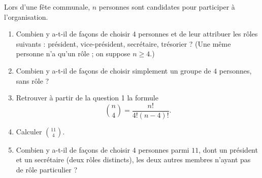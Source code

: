 Lors d'une fête communale, $n$ personnes sont candidates pour participer à
l'organisation.
\begin{enumerate}
  \item Combien y a-t-il de façons de choisir $4$ personnes et de leur
  attribuer les rôles suivants : président, vice-président, secrétaire,
  trésorier ? (Une même personne n'a qu'un rôle ; on suppose $n \ge 4$.)
  \item Combien y a-t-il de façons de choisir simplement un groupe de $4$
  personnes, sans rôle ?
  \item Retrouver à partir de la question 1 la formule
  \[
  \binom{n}{4} = \frac{n!}{4!(n-4)!}.
  \]
  \item Calculer $\binom{11}{4}$.
  \item Combien y a-t-il de façons de choisir $4$ personnes parmi $11$, dont un
  président et un secrétaire (deux rôles distincts), les deux autres membres
  n'ayant pas de rôle particulier ?
\end{enumerate}
